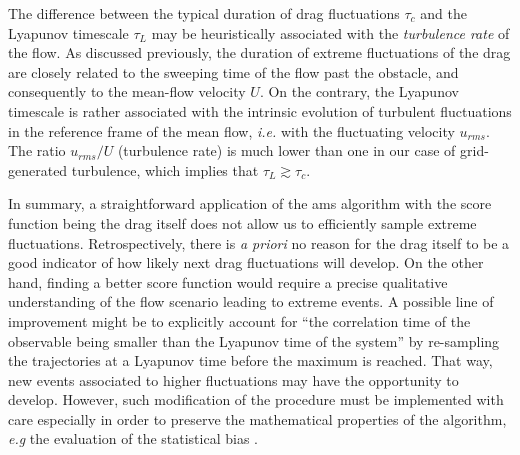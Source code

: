 \documentclass{jfm}
\begin{document}
The difference between the typical duration of drag fluctuations $\tau_c$ and the Lyapunov timescale $\tau_L$ may be heuristically associated with the \emph{turbulence rate} of the flow.
%
As discussed previously, the duration of extreme fluctuations of the drag are closely related to the sweeping time of the flow past the obstacle, and consequently to the mean-flow velocity $U$. On the contrary, the Lyapunov timescale is rather associated with the intrinsic evolution of turbulent fluctuations in the reference frame of the mean flow, \textit{i.e.} with the fluctuating velocity $u_{rms}$. The ratio $u_{rms}/U$ (turbulence rate) is much lower than one in our case of grid-generated turbulence, which implies that $\tau_L \gtrsim \tau_c$.
 


%
In summary, a straightforward application of the \ac{ams} algorithm with the score function being the drag itself does not allow us to efficiently sample extreme fluctuations.
%
Retrospectively, there is \textit{a priori} no reason for the drag itself to be a good indicator of how likely next drag fluctuations will develop.
On the other hand, finding a better score function would require a precise qualitative understanding of the flow scenario leading to extreme events.
%
%
A possible line of improvement might be to explicitly account for ``the correlation time of the observable being smaller than the Lyapunov time of the system'' by re-sampling the trajectories at a Lyapunov time {before} the maximum is reached. That way, new events associated to higher fluctuations may have the opportunity to develop.
However, such modification of the procedure must be implemented with care especially in order to preserve the mathematical properties of the algorithm, \emph{e.g} the evaluation of the statistical bias .
% 
\end{document}
